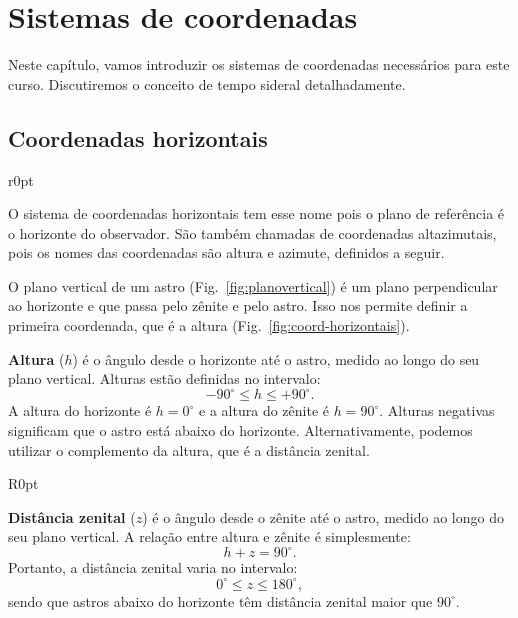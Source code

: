 \chapter{Sistemas de coordenadas}

Neste capítulo, vamos introduzir os sistemas de coordenadas necessários para este curso. Discutiremos o conceito de tempo sideral detalhadamente.

\section{Coordenadas horizontais}

\begin{wrapfigure}[20]{r}{0pt}

\caption{Plano vertical de um astro.}
\label{fig:planovertical}
\end{wrapfigure}

O sistema de coordenadas horizontais tem esse nome pois o plano de referência é o horizonte do observador. São também chamadas de coordenadas altazimutais, pois os nomes das coordenadas são altura e azimute, definidos a seguir.

O plano vertical de um astro (Fig.~\ref{fig:planovertical}) é um plano perpendicular ao horizonte e que passa pelo zênite e pelo astro. Isso nos permite definir a primeira coordenada, que é a altura (Fig.~\ref{fig:coord-horizontais}).
 
\textbf{Altura} ($h$) é o ângulo desde o horizonte até o astro, medido ao longo do seu plano vertical. Alturas estão definidas no intervalo:
%
\begin{equation}
-90^{\circ} \leqslant h \leqslant +90^{\circ}.
\end{equation}
%
A altura do horizonte é $h=0^{\circ}$ e a altura do zênite é $h=90^{\circ}$. Alturas negativas significam que o astro está abaixo do horizonte. Alternativamente, podemos utilizar o complemento da altura, que é a distância zenital.

\newpage

\begin{wrapfigure}[22]{R}{0pt}

\caption{Coordenadas horizontais: altura ($h$) e azimute ($A$).}
\label{fig:coord-horizontais}
\end{wrapfigure}

\textbf{Distância zenital} ($z$) é o ângulo desde o zênite até o astro, medido ao longo do seu plano vertical. A relação entre altura e zênite é simplesmente:
%
\begin{equation}
h + z  =  90^{\circ}.
\end{equation}
%
Portanto, a distância zenital varia no intervalo:
%
\begin{equation}
0^{\circ} \leqslant z \leqslant 180^{\circ},
\end{equation}
%
sendo que astros abaixo do horizonte têm distância zenital maior que $90^{\circ}$.

